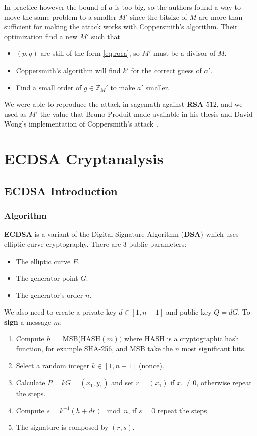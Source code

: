 \documentclass[a4paper,12pt]{report}
\newcommand{\Z}{\mathbb{Z}}
\begin{document}
In practice however the bound of $a$ is too big, so the authors found a way to move the same problem to a smaller $M'$ since the
bitsize of $M$ are more than sufficient for making the attack works with Coppersmith's algorithm. Their optimization
find a new $M'$ such that

\begin{itemize}
    \item $(p, q)$ are still of the form \ref{eq:roca}, so $M'$ must be a divisor of $M$.
    \item Coppersmith's algorithm will find $k'$ for the correct guess of $a'$.
    \item Find a small order of $g \in \Z_M'$ to make $a'$ smaller.
\end{itemize}

We were able to reproduce the attack in sagemath against \textbf{RSA}-$512$, and we used as $M'$ the value
that Bruno Produit \cite{rocaopt} made available in his thesis and David Wong's implementation of Coppersmith's attack \cite{wong2015}.

\chapter{ECDSA Cryptanalysis}

\section{ECDSA Introduction}

\subsection{Algorithm}

\textbf{ECDSA} is a variant of the Digital Signature Algorithm (\textbf{DSA}) which uses elliptic curve cryptography.
There are 3 public parameters:

\begin{itemize}
    \item The elliptic curve \textbf{$E$}.
    \item The generator point \textbf{$G$}.
    \item The generator's order \textbf{$n$}.
\end{itemize}

We also need to create a private key $d \in [1, n-1]$ and public key $Q = dG$. To \textbf{sign} a message $m$:

\begin{enumerate}
    \item Compute $h = $ MSB(HASH$(m))$ where HASH is a cryptographic hash function, for example SHA-256, and MSB take the $n$ most significant bits.
    \item Select a random integer $k \in [1, n-1]$ (nonce).
    \item Calculate $P = kG = (x_1, y_1)$ and set $r = (x_1)$ if $x_1 \neq 0$, otherwise repeat the steps.
    \item Compute $s = k^{-1}(h + dr) \mod n$, if $s = 0$ repeat the steps.
    \item The signature is composed by $(r, s)$.
\end{enumerate}
\end{document}
